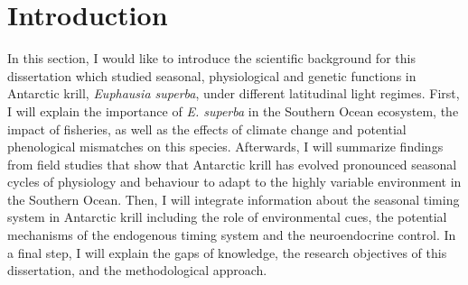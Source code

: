 
\chapter{Introduction} %

\label{Intro} %


\newcommand{\keyword}[1]{\textbf{#1}}
\newcommand{\tabhead}[1]{\textbf{#1}}
\newcommand{\code}[1]{\texttt{#1}}
\newcommand{\file}[1]{\texttt{\bfseries#1}}
\newcommand{\option}[1]{\texttt{\itshape#1}}


In this section, I would like to introduce the scientific background for this dissertation which studied seasonal, physiological and genetic functions in Antarctic krill, \textit{Euphausia superba}, under different latitudinal light regimes. First, I will explain the importance of \textit{E. superba} in the Southern Ocean ecosystem, the impact of fisheries, as well as the effects of climate change and potential phenological mismatches on this species. Afterwards, I will summarize findings from field studies that show that Antarctic krill has evolved pronounced seasonal cycles of physiology and behaviour to adapt to the highly variable environment in the Southern Ocean. Then, I will integrate information about the seasonal timing system in Antarctic krill including the role of environmental cues, the potential mechanisms of the endogenous timing system and the neuroendocrine control. In a final step, I will explain the gaps of knowledge, the research objectives of this dissertation, and the methodological approach.

